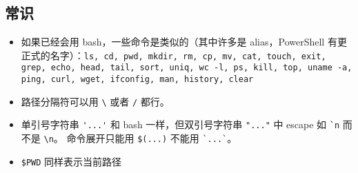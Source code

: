 
\subsection{常识}
\begin{itemize}
\item 如果已经会用 bash，一些命令是类似的（其中许多是 alias，PowerShell 有更正式的名字）：\verb`ls, cd, pwd, mkdir, rm, cp, mv, cat, touch, exit, grep, echo, head, tail, sort, uniq, wc -l, ps, kill, top, uname -a, ping, curl, wget, ifconfig, man, history, clear`
\item 路径分隔符可以用 \verb`\` 或者 \verb`/` 都行。
\item 单引号字符串 \verb`'...'` 和 bash 一样，但双引号字符串 \verb`"..."` 中 escape 如 \verb|`n| 而不是 \verb`\n`。 命令展开只能用 \verb`$(...)` 不能用 \verb|`...`|。
\item \verb`$PWD` 同样表示当前路径
\end{itemize}


